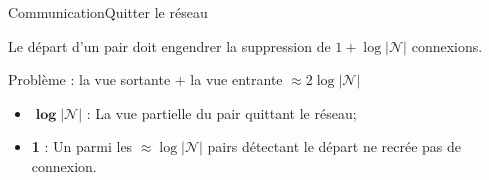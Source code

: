 \begin{frame}{Communication}{Quitter le réseau}

  Le départ d'un pair doit engendrer la suppression de $1+\log|\mathcal{N}|$ connexions.

  \vspace{0.5cm}

  Problème : la vue sortante + la vue entrante $\approx 2\log|\mathcal{N}|$
  \begin{itemize}
  \item $\pmb{\log|\mathcal{N}|}$ : La vue partielle du pair quittant le réseau;
  \item \textbf{1} : Un parmi les $\approx \log|\mathcal{N}|$ pairs détectant
    le départ ne recrée pas de connexion.
  \end{itemize}

  \vspace{0.5cm}\hspace{-1cm}
  \begin{minipage}{0.32\textwidth}
    \begin{center}
      
    \end{center}
  \end{minipage}
  \hspace{0.45cm}
  \begin{minipage}{0.32\textwidth}
    \begin{center}
      
    \end{center}
  \end{minipage}
  \hspace{0.45cm}
  \begin{minipage}{0.32\textwidth}
    \begin{center}
      
    \end{center}
  \end{minipage}





\end{frame}
